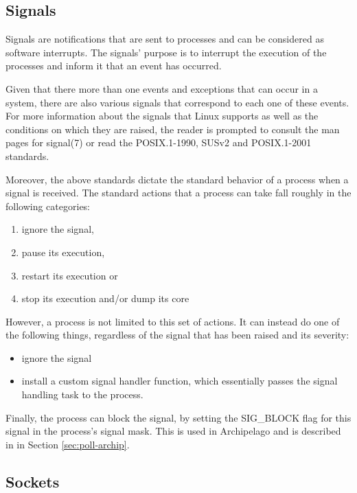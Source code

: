 \subsection{Signals}

Signals are notifications that are sent to processes and can be considered as 
software interrupts. The signals' purpose is to interrupt the execution of the 
processes and inform it that an event has occurred.

Given that there more than one events and exceptions that can occur in a 
system, there are also various signals that correspond to each one of these
events. For more information about the signals that Linux supports as well as 
the conditions on which they are raised, the reader is prompted to consult the 
man pages for signal(7) or read the POSIX.1-1990, SUSv2 and POSIX.1-2001 
standards.
  
Moreover, the above standards dictate the standard behavior of a process when a 
signal is received. The standard actions that a process can take fall roughly 
in the following categories:

\begin{enumerate}
	\item ignore the signal,
	\item pause its execution,
	\item restart its execution or
	\item stop its execution and/or dump its core
\end{enumerate}

However, a process is not limited to this set of actions. It can instead do one 
of the following things, regardless of the signal that has been raised and its 
severity:

\begin{itemize}
	\item ignore the signal
	\item install a custom signal handler function, which essentially 
		passes the signal handling task to the process.
\end{itemize}

Finally, the process can block the signal, by setting the SIG\_BLOCK flag for 
this signal in the process's signal mask. This is used in Archipelago and is 
described in in Section \ref{sec:poll-archip}.

\subsection{Sockets}

